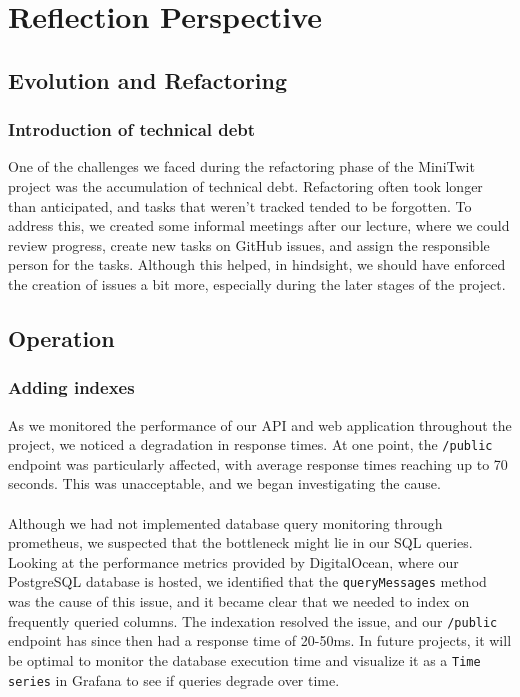 \section{Reflection Perspective}
\subsection{Evolution and Refactoring}
\subsubsection{Introduction of technical debt}
One of the challenges we faced during the refactoring phase of the MiniTwit project was the accumulation of technical debt. Refactoring often took longer than anticipated, and tasks that weren’t tracked tended to be forgotten. To address this, we created some informal meetings after our lecture, where we could review progress, create new tasks on GitHub issues, and assign the responsible person for the tasks. Although this helped, in hindsight, we should have enforced the creation of issues a bit more, especially during the later stages of the project.

\subsection{Operation}\label{operation}
\subsubsection{Adding indexes}
As we monitored the performance of our API and web application throughout the project, we noticed a degradation in response times. At one point, the \texttt{/public} endpoint was particularly affected, with average response times reaching up to 70 seconds. This was unacceptable, and we began investigating the cause.
\\\\
Although we had not implemented database query monitoring through prometheus, we suspected that the bottleneck might lie in our SQL queries. Looking at the performance metrics provided by DigitalOcean, where our PostgreSQL database is hosted, we identified that the \texttt{queryMessages} method was the cause of this issue, and it became clear that we needed to index on frequently queried columns. The indexation resolved the issue, and our \texttt{/public} endpoint has since then had a response time of 20-50ms. In future projects, it will be optimal to monitor the database execution time and visualize it as a \texttt{Time series} in Grafana to see if queries degrade over time.

